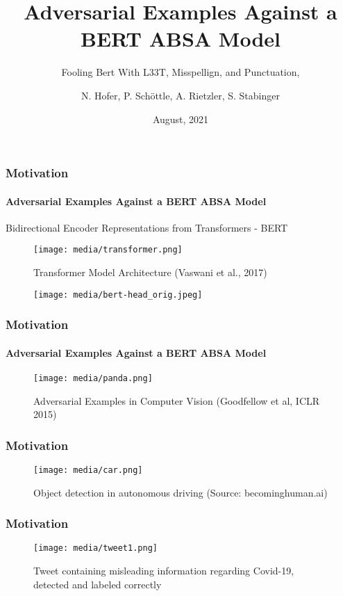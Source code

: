 \documentclass[aspectratio=1610,table,xcolor=dvipsnames]{beamer}
\title{Adversarial Examples Against a BERT ABSA Model}
\subtitle{Fooling Bert With L33T, Misspellign, and Punctuation,}
\author{N. Hofer, P. Schöttle, A. Rietzler, S. Stabinger}
\date{August, 2021}
\begin{document}



\begin{frame}
	\titlepage
\end{frame}



\begin{frame}
	\frametitle{Motivation}
	\framesubtitle{Adversarial Examples Against a \textbf{BERT} ABSA Model}
	Bidirectional Encoder Representations from Transformers - BERT
	\begin{figure}[H]
		\texttt{[image: media/transformer.png]}
		\caption{Transformer Model Architecture (Vaswani et al., 2017)}
	\end{figure}
	\begin{figure}[H]
		\texttt{[image: media/bert-head\_orig.jpeg]}
	\end{figure}

\end{frame}

\begin{frame}
	\frametitle{Motivation}
	\framesubtitle{\textbf{Adversarial Examples} Against a BERT ABSA Model}
	\begin{figure}[H]
		\centering
		\texttt{[image: media/panda.png]}
		\caption{Adversarial Examples in Computer Vision (Goodfellow et al, ICLR 2015)}
	\end{figure}

\end{frame}

\begin{frame}
	\frametitle{Motivation}
	\begin{figure}[H]
		\centering
		\texttt{[image: media/car.png]}
		\caption{Object detection in autonomous driving (Source: becominghuman.ai)}
	\end{figure}

\end{frame}

\begin{frame}
	\frametitle{Motivation}
	\begin{figure}[H]
		\centering
		\texttt{[image: media/tweet1.png]}
		\caption{Tweet containing misleading information regarding Covid-19, detected and labeled correctly}
	\end{figure}

\end{frame}
\end{document}
